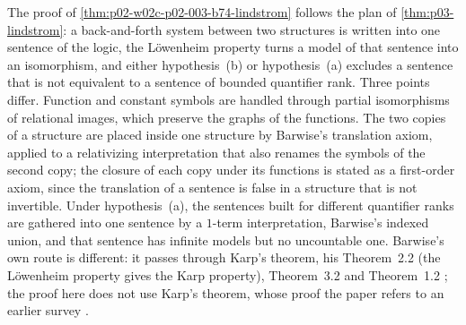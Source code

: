 The proof of \cref{thm:p02-w02c-p02-003-b74-lindstrom} follows the plan of
\cref{thm:p03-lindstrom}: a back-and-forth system between two structures
is written into one sentence of the logic, the L\"owenheim property turns a
model of that sentence into an isomorphism, and either hypothesis~(b) or
hypothesis~(a) excludes a sentence that is not equivalent to a sentence of
bounded quantifier rank.  Three points differ.  Function and constant
symbols are handled through partial isomorphisms of relational images,
which preserve the graphs of the functions.  The two copies of a structure
are placed inside one structure by Barwise's translation axiom, applied to
a relativizing interpretation that also renames the symbols of the second
copy; the closure of each copy under its functions is stated as a
first-order axiom, since the translation of a sentence is false in a
structure that is not invertible.  Under hypothesis~(a), the sentences
built for different quantifier ranks are gathered into one sentence by a
\(1\)-term interpretation, Barwise's indexed union, and that sentence has
infinite models but no uncountable one.  Barwise's own route is different:
it passes through Karp's theorem, his Theorem~2.2 (the L\"owenheim property
gives the Karp property), Theorem~3.2 and Theorem~1.2
\cite[Part~II, \S\S1--3, pp.~249--259]{Barwise1974Axioms}; the proof here
does not use Karp's theorem, whose proof the paper refers to an earlier
survey \cite[Part~I, \S10, p.~243]{Barwise1974Axioms}.

